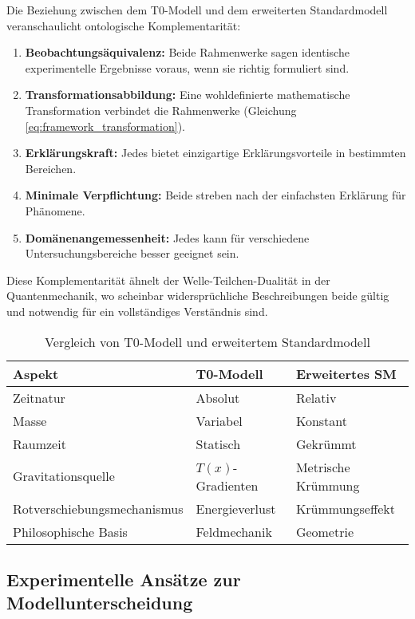 \documentclass[twocolumn,aps,prl]{revtex4-2}
\newcommand{\Tfield}{T(x)}
\begin{document}
	Die Beziehung zwischen dem T0-Modell und dem erweiterten Standardmodell veranschaulicht ontologische Komplementarität:
	
	\begin{enumerate}
		\item \textbf{Beobachtungsäquivalenz:} Beide Rahmenwerke sagen identische experimentelle Ergebnisse voraus, wenn sie richtig formuliert sind.
		\item \textbf{Transformationsabbildung:} Eine wohldefinierte mathematische Transformation verbindet die Rahmenwerke (Gleichung \ref{eq:framework_transformation}).
		\item \textbf{Erklärungskraft:} Jedes bietet einzigartige Erklärungsvorteile in bestimmten Bereichen.
		\item \textbf{Minimale Verpflichtung:} Beide streben nach der einfachsten Erklärung für Phänomene.
		\item \textbf{Domänenangemessenheit:} Jedes kann für verschiedene Untersuchungsbereiche besser geeignet sein.
	\end{enumerate}
	
	Diese Komplementarität ähnelt der Welle-Teilchen-Dualität in der Quantenmechanik, wo scheinbar widersprüchliche Beschreibungen beide gültig und notwendig für ein vollständiges Verständnis sind.
	
	\begin{table}[ht]
		\centering
		\caption{Vergleich von T0-Modell und erweitertem Standardmodell}
		\label{tab:model_comparison}
		\small
		\begin{tabular}{p{} p{} p{}}
			\hline
			\textbf{Aspekt} & \textbf{T0-Modell} & \textbf{Erweitertes SM} \\
			\hline
			Zeitnatur & Absolut & Relativ \\
			Masse & Variabel & Konstant \\
			Raumzeit & Statisch & Gekrümmt \\
			Gravitationsquelle & \(\Tfield\)-Gradienten & Metrische Krümmung \\
			Rotverschiebungsmechanismus & Energieverlust & Krümmungseffekt \\
			Philosophische Basis & Feldmechanik & Geometrie \\
			\hline
		\end{tabular}
	\end{table}
	
	\subsection{Experimentelle Ansätze zur Modellunterscheidung}
	\label{subsec:model_discrimination}
	
\end{document}

